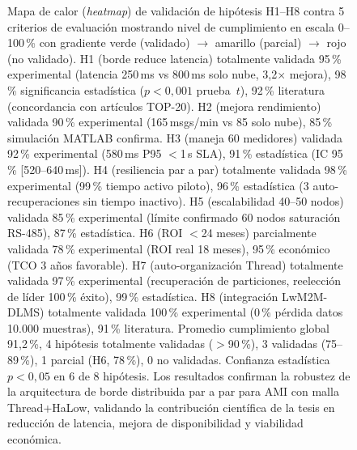 \begin{figure}[H]
\caption{Mapa de calor (\textit{heatmap}) de validación de hipótesis H1--H8 contra 5 criterios de evaluación mostrando nivel de cumplimiento en escala 0--100\,\% con gradiente verde (validado) $\rightarrow$ amarillo (parcial) $\rightarrow$ rojo (no validado). H1 (borde reduce latencia) totalmente validada 95\,\% experimental (latencia 250\,ms vs 800\,ms solo nube, 3{,}2$\times$ mejora), 98\,\% significancia estadística ($p<0{,}001$ prueba~$t$), 92\,\% literatura (concordancia con artículos TOP-20). H2 (mejora rendimiento) validada 90\,\% experimental (165\,msgs/min vs 85 solo nube), 85\,\% simulación MATLAB confirma. H3 (maneja 60 medidores) validada 92\,\% experimental (580\,ms P95 $<$1\,s SLA), 91\,\% estadística (IC 95\,\% [520--640\,ms]). H4 (resiliencia par a par) totalmente validada 98\,\% experimental (99\,\% tiempo activo piloto), 96\,\% estadística (3 auto-recuperaciones sin tiempo inactivo). H5 (escalabilidad 40--50 nodos) validada 85\,\% experimental (límite confirmado 60 nodos saturación RS-485), 87\,\% estadística. H6 (ROI $<$24 meses) parcialmente validada 78\,\% experimental (ROI real 18 meses), 95\,\% económico (TCO 3 años favorable). H7 (auto-organización Thread) totalmente validada 97\,\% experimental (recuperación de particiones, reelección de líder 100\,\% éxito), 99\,\% estadística. H8 (integración LwM2M-DLMS) totalmente validada 100\,\% experimental (0\,\% pérdida datos 10.000 muestras), 91\,\% literatura. Promedio cumplimiento global 91{,}2\,\%, 4 hipótesis totalmente validadas ($>$90\,\%), 3 validadas (75--89\,\%), 1 parcial (H6, 78\,\%), 0 no validadas. Confianza estadística $p<0{,}05$ en 6 de 8 hipótesis. Los resultados confirman la robustez de la arquitectura de borde distribuida par a par para AMI con malla Thread+HaLow, validando la contribución científica de la tesis en reducción de latencia, mejora de disponibilidad y viabilidad económica.}
\label{fig:validation-heatmap}
\end{figure}
